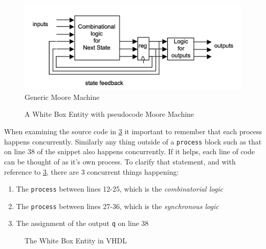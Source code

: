 \begin{figure}[H]
    \begin{center}
        \includegraphics[width=\textwidth]{./src/moore_machine.png}
    \end{center}
    \caption{Generic Moore Machine}
    \label{fig:mm}
\end{figure}

\begin{figure}[H]
    \begin{center}
        
    \end{center}
    \caption{A White Box Entity with pseudocode Moore Machine}
    \label{fig:wbe}
\end{figure}

When examining the source code in \cref{fig:arch} it important to remember that each process happens concurrently. Similarly any thing outside of a \texttt{process} block such as that on line 38 of the snippet also happens concurrently. If it helps, each line of code can be thought of as it's own process. To clarify that statement, and with reference to \cref{fig:arch}, there are 3 concurrent things happening:
\begin{enumerate}
	\item The \texttt{process} between lines 12-25, which is the \emph{combinatorial logic}
	\item The \texttt{process} between lines 27-36, which is the \emph{synchronous logic}
	\item The assignment of the output \texttt{q} on line 38
\end{enumerate}

\begin{figure}[H]
    \begin{center}
    	
    \end{center}
    \caption{The White Box Entity in VHDL}
    \label{fig:arch}
\end{figure}

